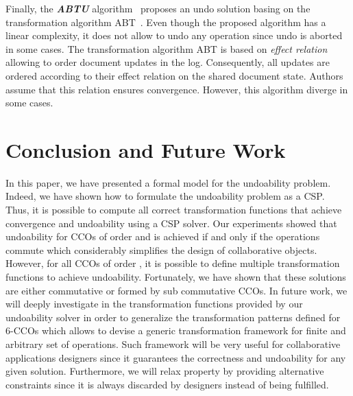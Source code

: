 \documentclass[submission,copyright,creativecommons]{eptcs}
\begin{document}
Finally, the \textbf{\emph{ABTU}} algorithm~\cite{BinShao10}   proposes an undo solution     basing on the transformation algorithm ABT~\cite{LiLi10}.
Even though the proposed algorithm has a linear complexity, it  does not allow to undo any operation since undo is aborted in some cases.
The transformation algorithm ABT is based on   \textit{effect relation} allowing to order document updates in the log. Consequently, all updates are ordered according to their effect relation on the shared document state.
 Authors assume that this relation ensures convergence. However, this algorithm diverge in some cases.

\section{Conclusion and Future Work}
In this paper, we have presented a formal model for the undoability problem. Indeed, we have shown how to formulate the undoability problem as a CSP. Thus, it is possible to compute all correct transformation functions that achieve convergence and undoability  using a CSP solver. Our experiments showed that  undoability for CCOs of order  and  is  achieved if and only if the operations commute  which considerably simplifies the design of collaborative objects. However, for all CCOs of order , it is possible to define multiple transformation functions to achieve undoability. Fortunately, we have shown that these solutions are either commutative or formed by sub commutative CCOs. In future work,  we will deeply investigate in the transformation functions provided by our undoability solver in order to generalize the transformation patterns defined for 6-CCOs which allows to devise a generic transformation framework for finite and arbitrary set of operations. Such framework will be very useful for collaborative applications designers since it guarantees the correctness and undoability for any given solution. Furthermore, we will relax property  by providing alternative constraints since it is   always discarded by designers instead of being fulfilled.



 



\end{document}
